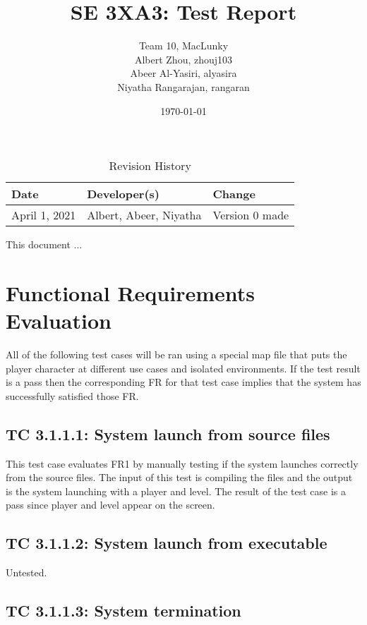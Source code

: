 \documentclass[12pt, titlepage]{article}
\title{SE 3XA3: Test Report}
\author{Team 10, MacLunky
		\\ Albert Zhou, zhouj103
		\\Abeer Al-Yasiri, alyasira
		\\ Niyatha Rangarajan, rangaran
}
\date{\today}
\begin{document}
\maketitle

\tableofcontents
\listoftables
\listoffigures

\begin{table}[hp]
\caption{Revision History} \label{TblRevisionHistory}
\begin{tabularx}{\textwidth}{llX}
\toprule
\textbf{Date} & \textbf{Developer(s)} & \textbf{Change}\\
\midrule
April 1, 2021 & Albert, Abeer, Niyatha & Version 0 made\\
\bottomrule
\end{tabularx}
\end{table}

\newpage


This document ...

\section{Functional Requirements Evaluation}
All of the following test cases will be ran using a special map file that puts the player character at different use cases and isolated environments. If the test result is a pass then the corresponding FR for that test case implies that the system has successfully satisfied those FR. 

\subsection*{TC 3.1.1.1: System launch from source files}

This test case evaluates FR1 by manually testing if the system launches correctly from the source files. The input of this test is compiling the files and the output is the system launching with a player and level. The result of the test case is a pass since player and level appear on the screen.

\subsection*{TC 3.1.1.2: System launch from executable}

Untested.

\subsection*{TC 3.1.1.3: System termination}
\end{document}
